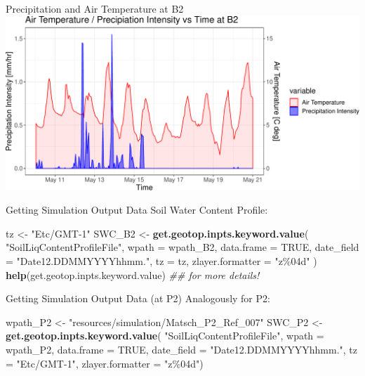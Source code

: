\documentclass[
  ignorenonframetext,
]{beamer}
\newenvironment{Shaded}{\begin{snugshade}}{\end{snugshade}}
\newcommand{\CommentTok}[1]{\textcolor[rgb]{0.56,0.35,0.01}{\textit{#1}}}
\newcommand{\DataTypeTok}[1]{\textcolor[rgb]{0.13,0.29,0.53}{#1}}
\newcommand{\KeywordTok}[1]{\textcolor[rgb]{0.13,0.29,0.53}{\textbf{#1}}}
\newcommand{\NormalTok}[1]{#1}
\newcommand{\OtherTok}[1]{\textcolor[rgb]{0.56,0.35,0.01}{#1}}
\newcommand{\StringTok}[1]{\textcolor[rgb]{0.31,0.60,0.02}{#1}}
\begin{document}
\begin{frame}{Precipitation and Air Temperature at B2}
\protect\hypertarget{precipitation-and-air-temperature-at-b2}{}
\includegraphics{presentation_files/figure-beamer/unnamed-chunk-3-1.pdf}
\end{frame}

\begin{frame}[fragile]{Getting Simulation Output Data}
\protect\hypertarget{getting-simulation-output-data}{}
Soil Water Content Profile:

\begin{Shaded}
\begin{Highlighting}[]
\NormalTok{tz <{-}}\StringTok{ "Etc/GMT{-}1"}
\NormalTok{SWC\_B2  <{-}}\StringTok{ }\KeywordTok{get.geotop.inpts.keyword.value}\NormalTok{(}
  \StringTok{"SoilLiqContentProfileFile"}\NormalTok{,}
  \DataTypeTok{wpath =}\NormalTok{ wpath\_B2,}
  \DataTypeTok{data.frame =} \OtherTok{TRUE}\NormalTok{,}
  \DataTypeTok{date\_field =} \StringTok{"Date12.DDMMYYYYhhmm."}\NormalTok{,}
  \DataTypeTok{tz =}\NormalTok{ tz,}
  \DataTypeTok{zlayer.formatter =} \StringTok{"z\%04d"}
\NormalTok{)}
\KeywordTok{help}\NormalTok{(get.geotop.inpts.keyword.value) }\CommentTok{\#\# for more details!}
\end{Highlighting}
\end{Shaded}
\end{frame}

\begin{frame}[fragile]{Getting Simulation Output Data (at P2)}
\protect\hypertarget{getting-simulation-output-data-at-p2}{}
Analogously for P2:

\begin{Shaded}
\begin{Highlighting}[]
\NormalTok{wpath\_P2 <{-}}\StringTok{ "resources/simulation/Matsch\_P2\_Ref\_007"} 
\NormalTok{SWC\_P2  <{-}}\StringTok{ }\KeywordTok{get.geotop.inpts.keyword.value}\NormalTok{(}
  \StringTok{"SoilLiqContentProfileFile"}\NormalTok{,}
  \DataTypeTok{wpath =}\NormalTok{ wpath\_P2,}
  \DataTypeTok{data.frame =} \OtherTok{TRUE}\NormalTok{,}
  \DataTypeTok{date\_field =} \StringTok{"Date12.DDMMYYYYhhmm."}\NormalTok{,}
  \DataTypeTok{tz =} \StringTok{"Etc/GMT{-}1"}\NormalTok{,}
  \DataTypeTok{zlayer.formatter =} \StringTok{"z\%04d"}\NormalTok{)}
\end{Highlighting}
\end{Shaded}
\end{frame}
\end{document}
